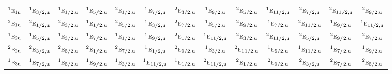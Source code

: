 \documentclass[10pt,a4paper]{article}
\numberwithin{equation}{section}
\newcommand{\irr}[1]{\text{\normalfont\scshape #1}}
\newcommand{\conjpair}[1]{{}^{#1}}
\newcommand{\ptag}[1]{\mathrm{#1}}
\begin{document}
{\begin{longtable}{@{}lcccccccccccc@{}}
$\conjpair{1}\irr{e}_{1\ptag{u}}$ & $\conjpair{1}\irr{e}_{3/2,\ptag{u}}$ & $\conjpair{1}\irr{e}_{1/2,\ptag{u}}$ & $\conjpair{1}\irr{e}_{5/2,\ptag{u}}$ & $\conjpair{2}\irr{e}_{1/2,\ptag{u}}$ & $\conjpair{1}\irr{e}_{7/2,\ptag{u}}$ & $\conjpair{2}\irr{e}_{3/2,\ptag{u}}$ & $\conjpair{1}\irr{e}_{9/2,\ptag{u}}$ & $\conjpair{2}\irr{e}_{5/2,\ptag{u}}$ & $\conjpair{1}\irr{e}_{11/2,\ptag{u}}$ & $\conjpair{2}\irr{e}_{7/2,\ptag{u}}$ & $\conjpair{2}\irr{e}_{11/2,\ptag{u}}$ & $\conjpair{2}\irr{e}_{9/2,\ptag{u}}$\\
$\conjpair{2}\irr{e}_{1\ptag{u}}$ & $\conjpair{2}\irr{e}_{1/2,\ptag{u}}$ & $\conjpair{2}\irr{e}_{3/2,\ptag{u}}$ & $\conjpair{1}\irr{e}_{1/2,\ptag{u}}$ & $\conjpair{2}\irr{e}_{5/2,\ptag{u}}$ & $\conjpair{1}\irr{e}_{3/2,\ptag{u}}$ & $\conjpair{2}\irr{e}_{7/2,\ptag{u}}$ & $\conjpair{1}\irr{e}_{5/2,\ptag{u}}$ & $\conjpair{2}\irr{e}_{9/2,\ptag{u}}$ & $\conjpair{1}\irr{e}_{7/2,\ptag{u}}$ & $\conjpair{2}\irr{e}_{11/2,\ptag{u}}$ & $\conjpair{1}\irr{e}_{9/2,\ptag{u}}$ & $\conjpair{1}\irr{e}_{11/2,\ptag{u}}$\\
$\conjpair{1}\irr{e}_{2\ptag{u}}$ & $\conjpair{1}\irr{e}_{5/2,\ptag{u}}$ & $\conjpair{1}\irr{e}_{3/2,\ptag{u}}$ & $\conjpair{1}\irr{e}_{7/2,\ptag{u}}$ & $\conjpair{1}\irr{e}_{1/2,\ptag{u}}$ & $\conjpair{1}\irr{e}_{9/2,\ptag{u}}$ & $\conjpair{2}\irr{e}_{1/2,\ptag{u}}$ & $\conjpair{1}\irr{e}_{11/2,\ptag{u}}$ & $\conjpair{2}\irr{e}_{3/2,\ptag{u}}$ & $\conjpair{2}\irr{e}_{11/2,\ptag{u}}$ & $\conjpair{2}\irr{e}_{5/2,\ptag{u}}$ & $\conjpair{2}\irr{e}_{9/2,\ptag{u}}$ & $\conjpair{2}\irr{e}_{7/2,\ptag{u}}$\\
$\conjpair{2}\irr{e}_{2\ptag{u}}$ & $\conjpair{2}\irr{e}_{3/2,\ptag{u}}$ & $\conjpair{2}\irr{e}_{5/2,\ptag{u}}$ & $\conjpair{2}\irr{e}_{1/2,\ptag{u}}$ & $\conjpair{2}\irr{e}_{7/2,\ptag{u}}$ & $\conjpair{1}\irr{e}_{1/2,\ptag{u}}$ & $\conjpair{2}\irr{e}_{9/2,\ptag{u}}$ & $\conjpair{1}\irr{e}_{3/2,\ptag{u}}$ & $\conjpair{2}\irr{e}_{11/2,\ptag{u}}$ & $\conjpair{1}\irr{e}_{5/2,\ptag{u}}$ & $\conjpair{1}\irr{e}_{11/2,\ptag{u}}$ & $\conjpair{1}\irr{e}_{7/2,\ptag{u}}$ & $\conjpair{1}\irr{e}_{9/2,\ptag{u}}$\\
$\conjpair{1}\irr{e}_{3\ptag{u}}$ & $\conjpair{1}\irr{e}_{7/2,\ptag{u}}$ & $\conjpair{1}\irr{e}_{5/2,\ptag{u}}$ & $\conjpair{1}\irr{e}_{9/2,\ptag{u}}$ & $\conjpair{1}\irr{e}_{3/2,\ptag{u}}$ & $\conjpair{1}\irr{e}_{11/2,\ptag{u}}$ & $\conjpair{1}\irr{e}_{1/2,\ptag{u}}$ & $\conjpair{2}\irr{e}_{11/2,\ptag{u}}$ & $\conjpair{2}\irr{e}_{1/2,\ptag{u}}$ & $\conjpair{2}\irr{e}_{9/2,\ptag{u}}$ & $\conjpair{2}\irr{e}_{3/2,\ptag{u}}$ & $\conjpair{2}\irr{e}_{7/2,\ptag{u}}$ & $\conjpair{2}\irr{e}_{5/2,\ptag{u}}$\\

\end{longtable}}
\end{document}
